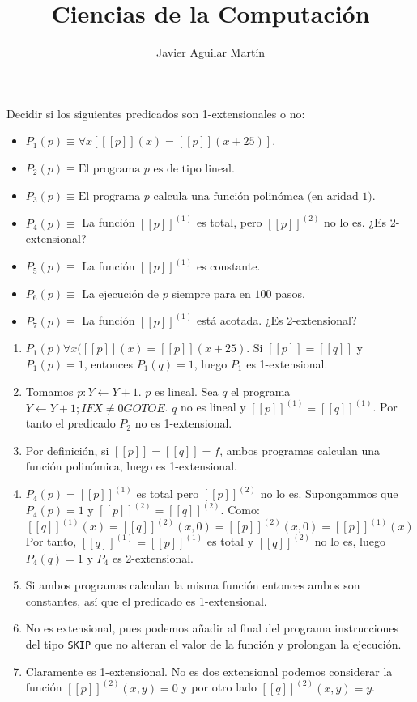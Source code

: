 \documentclass[twoside]{article}
\begin{document}
\title{Ciencias de la Computación}

\author{Javier Aguilar Martín}
\maketitle

\begin{ejercicio}{1}
Decidir si los siguientes predicados son 1-extensionales o no:
\begin{itemize}
	\item $P_1(p) \equiv \forall x [[\![p]\!](x) = [[p]](x+25)]$.
	\item $P_2(p) \equiv \text{El programa }p\text{ es de tipo lineal}$.
	\item $P_3(p) \equiv \text{El programa }p\text{ calcula una función polinómca (en aridad 1)}$.
	\item $P_4(p) \equiv$ La función $[[p]]^{(1)}$ es total, pero $[[p]]^{(2)}$ no lo es. ¿Es 2-extensional?
	\item $P_5(p) \equiv$ La función $[[p]]^{(1)}$ es constante.
	\item $P_6(p) \equiv$ La ejecución de $p$ siempre para en $100$ pasos.
	\item $P_7(p) \equiv$ La función $[[p]]^{(1)}$ está acotada. ¿Es 2-extensional?
\end{itemize}
\end{ejercicio}
\begin{solucion}
\end{solucion}
\begin{enumerate}
	\item $P_1(p)  \forall x ( [[p]](x) = [[p]](x+25)$. Si $[[p]]=[[q]]$ y $P_1(p) = 1$, entonces $P_1(q) = 1$, luego $P_1$ es 1-extensional.
	
	\item Tomamos $p : Y \leftarrow Y+1$. $p$ es lineal. Sea $q$ el programa $Y \leftarrow Y+1; IF X \neq 0 GOTO E$. $q$ no es lineal y $[[p]]^{(1)} = [[q]]^{(1)}$. Por tanto el predicado $P_2$ no es 1-extensional.
	
	\item Por definición, si $[[p]]=[[q]]=f$, ambos programas calculan una función polinómica, luego es 1-extensional.
	\item $P_4(p) = [[p]]^{(1)}$ es total pero $[[p]]^{(2)}$ no lo es. Supongammos que $P_4(p) = 1$ y $[[p]]^{(2)} = [[q]]^{(2)}$. Como:
	\[ [[q]]^{(1)}(x) = [[q]]^{(2)}(x,0) = [[p]]^{(2)}(x,0) = [[p]]^{(1)}(x) \]
	Por tanto, $[[q]]^{(1)} = [[p]]^{(1)}$ es total y $[[q]]^{(2)}$ no lo es, luego $P_4(q) = 1$ y $P_4$ es 2-extensional.
	\item Si ambos programas calculan la misma función entonces ambos son constantes, así que el predicado es 1-extensional.
	\item No es extensional, pues podemos añadir al final del programa instrucciones del tipo \texttt{SKIP} que no alteran el valor de la función y prolongan la ejecución. 
	\item Claramente es 1-extensional. No es dos extensional podemos considerar la función $[[p]]^{(2)}(x,y)=0$ y por otro lado $[[q]]^{(2)}(x,y)=y$.
\end{enumerate}
\end{document}
